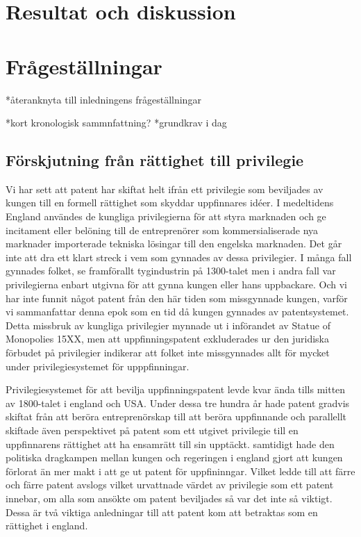 \section{Resultat och diskussion}



\section{Frågeställningar}
*återanknyta till inledningens frågeställningar

*kort kronologisk sammnfattning? 
*grundkrav i dag

\subsection{Förskjutning från rättighet till privilegie}
Vi har sett att patent har skiftat helt ifrån ett privilegie som beviljades av kungen till en formell rättighet som skyddar uppfinnares idéer. I medeltidens England användes de kungliga privilegierna för att styra marknaden och ge incitament eller belöning till de entreprenörer som kommersialiserade nya marknader importerade tekniska lösingar till den engelska marknaden. Det går inte att dra ett klart streck i vem som gynnades av dessa privilegier. I många fall gynnades folket, se framförallt tygindustrin på 1300-talet %
men i andra fall var privilegierna enbart utgivna för att gynna kungen eller hans uppbackare.%
Och vi har inte funnit något patent från den här tiden som missgynnade kungen, varför vi sammanfattar denna epok som en tid då kungen gynnades av patentsystemet. Detta missbruk av kungliga privilegier mynnade ut i införandet av Statue of Monopolies 15XX, men att uppfinningspatent exkluderades ur den juridiska förbudet på privilegier indikerar att folket inte missgynnades allt för mycket under privilegiesystemet för upppfinningar.

Privilegiesystemet för att bevilja uppfinningspatent levde kvar ända tills mitten av 1800-talet i england och USA. Under dessa tre hundra år hade patent gradvis skiftat från att beröra entreprenörskap till att beröra uppfinnande och parallellt skiftade även perspektivet på patent som ett utgivet privilegie till en uppfinnarens rättighet att ha ensamrätt till sin upptäckt. samtidigt hade den politiska dragkampen mellan kungen och regeringen i england gjort att kungen förlorat än mer makt i att ge ut patent för uppfininngar. Vilket ledde till att färre och färre patent avslogs vilket urvattnade värdet av privilegie som ett patent innebar, om alla som ansökte om patent beviljades så var det inte så viktigt. Dessa är två viktiga anledningar till att patent kom att betraktas som en rättighet i england.

